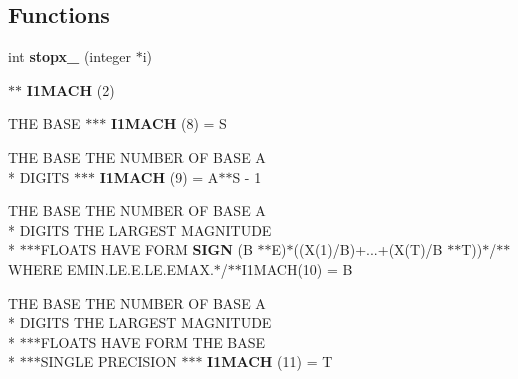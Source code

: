\subsection*{Functions}
\begin{DoxyCompactItemize}
\item 
\hypertarget{namespaceport_a269eb679d57a4ff94d0879fb87e97141}{int {\bfseries stopx\+\_\+} (integer $\ast$i)}\label{namespaceport_a269eb679d57a4ff94d0879fb87e97141}

\item 
$\ast$$\ast$ {\bfseries I1\+M\+A\+C\+H} (2)
\item 
\hypertarget{namespaceport_a454ddeae533f5fd6008840339b5dd0be}{T\+H\+E B\+A\+S\+E $\ast$$\ast$$\ast$ {\bfseries I1\+M\+A\+C\+H} (8) = S}\label{namespaceport_a454ddeae533f5fd6008840339b5dd0be}

\item 
\hypertarget{namespaceport_a7f5bce1410c05213d985ee0c05ee3255}{T\+H\+E B\+A\+S\+E T\+H\+E N\+U\+M\+B\+E\+R O\+F B\+A\+S\+E A \\*
D\+I\+G\+I\+T\+S $\ast$$\ast$$\ast$ {\bfseries I1\+M\+A\+C\+H} (9) = A$\ast$$\ast$S -\/ 1}\label{namespaceport_a7f5bce1410c05213d985ee0c05ee3255}

\item 
\hypertarget{namespaceport_ae7aca625b2b9ccad2ac9110fc691ec84}{T\+H\+E B\+A\+S\+E T\+H\+E N\+U\+M\+B\+E\+R O\+F B\+A\+S\+E A \\*
D\+I\+G\+I\+T\+S T\+H\+E L\+A\+R\+G\+E\+S\+T M\+A\+G\+N\+I\+T\+U\+D\+E \\*
$\ast$$\ast$$\ast$F\+L\+O\+A\+T\+S H\+A\+V\+E F\+O\+R\+M {\bfseries S\+I\+G\+N} (B $\ast$$\ast$E)$\ast$((X(1)/B)+...+(X(T)/B $\ast$$\ast$T))$\ast$/$\ast$$\ast$W\+H\+E\+R\+E E\+M\+I\+N.\+L\+E.\+E.\+L\+E.\+E\+M\+A\+X.$\ast$/$\ast$$\ast$I1\+M\+A\+C\+H(10) = B}\label{namespaceport_ae7aca625b2b9ccad2ac9110fc691ec84}

\item 
\hypertarget{namespaceport_a149f09411845b9eda601ef7befd8e499}{T\+H\+E B\+A\+S\+E T\+H\+E N\+U\+M\+B\+E\+R O\+F B\+A\+S\+E A \\*
D\+I\+G\+I\+T\+S T\+H\+E L\+A\+R\+G\+E\+S\+T M\+A\+G\+N\+I\+T\+U\+D\+E \\*
$\ast$$\ast$$\ast$F\+L\+O\+A\+T\+S H\+A\+V\+E F\+O\+R\+M T\+H\+E B\+A\+S\+E \\*
$\ast$$\ast$$\ast$S\+I\+N\+G\+L\+E P\+R\+E\+C\+I\+S\+I\+O\+N $\ast$$\ast$$\ast$ {\bfseries I1\+M\+A\+C\+H} (11) = T}\label{namespaceport_a149f09411845b9eda601ef7befd8e499}


\end{DoxyCompactItemize}

